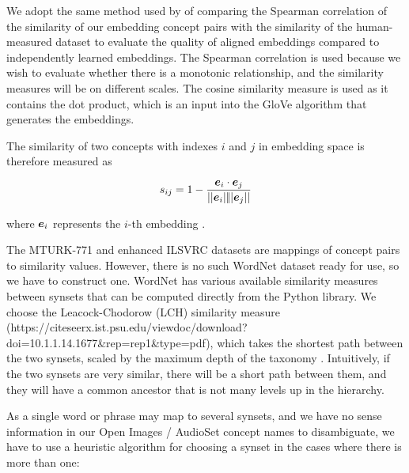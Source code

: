 We adopt the same method used by \cite{mturk771} of comparing the Spearman correlation of the similarity of our embedding concept pairs with the similarity of the human-measured dataset to evaluate the quality of aligned embeddings compared to independently learned embeddings. The Spearman correlation is used because we wish to evaluate whether there is a monotonic relationship, and the similarity measures will be on different scales. The cosine similarity measure is used as it contains the dot product, which is an input into the GloVe algorithm that generates the embeddings.

The similarity of two concepts with indexes $i$ and $j$ in embedding space is therefore measured as

\begin{equation}
s_{ij} = 1 - \frac{\boldsymbol{e}_i \cdot \boldsymbol{e}_j}{||\boldsymbol{e}_i||\!||\boldsymbol{e}_j||}
\end{equation}

where $\boldsymbol{e}_i$ represents the $i$-th embedding .

The MTURK-771 and enhanced ILSVRC datasets are mappings of concept pairs to similarity values. However, there is no such WordNet dataset ready for use, so we have to construct one. WordNet has various available similarity measures between synsets that can be computed directly from the Python library. We choose the Leacock-Chodorow (LCH) similarity measure (https://citeseerx.ist.psu.edu/viewdoc/download?doi=10.1.1.14.1677&rep=rep1&type=pdf), which takes the shortest path between the two synsets, scaled by the maximum depth of the taxonomy . Intuitively, if the two synsets are very similar, there will be a short path between them, and they will have a common ancestor that is not many levels up in the hierarchy. 

As a single word or phrase may map to several synsets, and we have no sense information in our Open Images / AudioSet concept names to disambiguate, we have to use a heuristic algorithm for choosing a synset in the cases where there is more than one:

